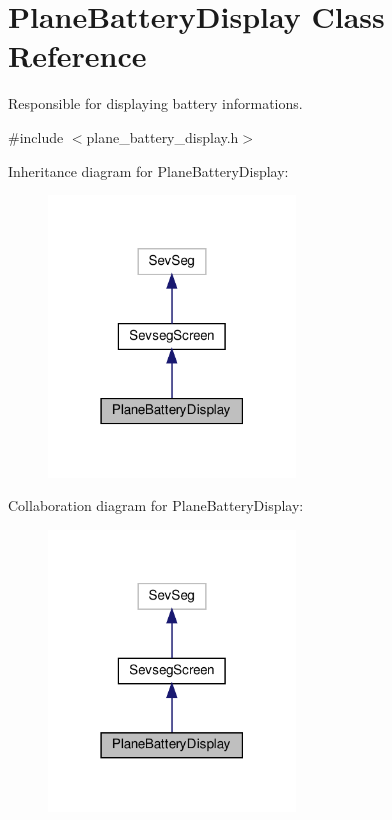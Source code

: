 \hypertarget{class_plane_battery_display}{}\section{Plane\+Battery\+Display Class Reference}
\label{class_plane_battery_display}


Responsible for displaying battery informations.  




{\ttfamily \#include $<$plane\+\_\+battery\+\_\+display.\+h$>$}



Inheritance diagram for Plane\+Battery\+Display\+:
\nopagebreak
\begin{figure}[H]
\begin{center}
\leavevmode
\includegraphics[width=186pt]{class_plane_battery_display__inherit__graph}
\end{center}
\end{figure}


Collaboration diagram for Plane\+Battery\+Display\+:
\nopagebreak
\begin{figure}[H]
\begin{center}
\leavevmode
\includegraphics[width=186pt]{class_plane_battery_display__coll__graph}
\end{center}
\end{figure}
